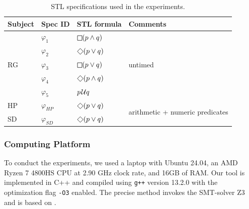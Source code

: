 \begin{table}
\centering
\begin{tabular}{|l|l|l|l|}
\hline
Subject & Spec ID & STL formula & Comments \\
\hline
\multirow{ 5}{*}{RG} & $\varphi_1$ & $\LTLg (p \wedge q)$ & \multirow{ 5}{*}{untimed} \\
& $\varphi_2$ & $\LTLf (p \vee q)$ & \\
& $\varphi_3$ & $\LTLg (p \vee q)$ & \\
& $\varphi_4$ & $\LTLf (p \wedge q)$ & \\
& $\varphi_5$ & $p \kern.1em\mathcal{U} q$ & \\
\hline
HP & $\varphi_{HP}$ & $\LTLf (p \vee q)$ & \multirow{ 2}{*}{arithmetic + numeric predicates} \\
SD & $\varphi_{SD}$ & $\LTLf (p \vee q)$ &  \\
\hline
\end{tabular}
\caption{STL specifications used in the experiments.}
\label{tab:spec} 
\end{table}

\subsubsection{Computing Platform}

To conduct the experiments, we used a laptop with Ubuntu 24.04, an AMD Ryzen 7 4800HS CPU at 2.90 GHz clock rate, and 16GB of RAM.
Our tool is implemented in C++ and compiled using \texttt{g++} version 13.2.0 with the optimization flag \texttt{-O3} enabled.
The precise method invokes the SMT-solver Z3 \cite{MouraB08} and is based on \cite{MomtazAB23}.

